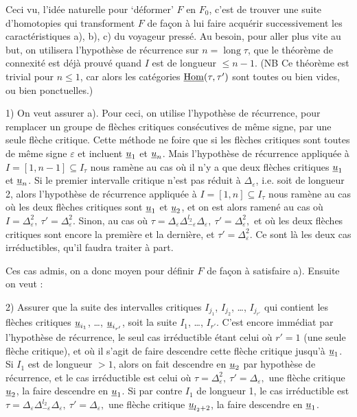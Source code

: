Ceci vu, l'idée naturelle pour ‘déformer’ $F$ en $F_0$, c'est de trouver une suite d'homotopies qui transforment $F$ de façon à lui faire acquérir successivement les caractéristiques a), b), c) du voyageur pressé. Au besoin, pour aller plus vite au but, on utilisera l'hypothèse de récurrence sur $n=\operatorname{long}\tau$, que le théorème de connexité est déjà prouvé quand $I$ est de longueur $\leq n-1$. (NB Ce théorème est trivial pour $n\leq1$, car alors les catégories $\underline{\mathrm{Hom}}(\tau,\tau')$ sont toutes ou bien vides, ou bien ponctuelles.)

1) On veut assurer a). Pour ceci, on utilise l'hypothèse de récurrence, pour remplacer un groupe de flèches critiques consécutives de même signe, par une seule flèche critique. Cette méthode ne foire que si les flèches critiques sont toutes de même signe $\varepsilon$ et incluent $\underline{u}_1$ et $\underline{u}_n$. Mais l'hypothèse de récurrence appliquée à $I=[1,n-1]\subseteq I_\tau$ nous ramène au cas où il n'y a que deux flèches critiques $\underline{u}_1$ et $\underline{u}_n$. Si le premier intervalle critique n'est pas réduit à $\Delta_\varepsilon$, i.e. soit de longueur 2, alors l'hypothèse de récurrence appliquée à $I=[1,n]\subseteq I_\tau$ nous ramène au cas où les deux flèches critiques sont $\underline{u}_1$ et $\underline{u}_2$, et on est
alors ramené au cas où $\boxed{I=\Delta^2_\varepsilon,\ \tau'=\Delta^2_\varepsilon.}$ Sinon, au cas où $\boxed{\tau=\Delta_\varepsilon\Delta^{l_2}_{-\varepsilon}\Delta_\varepsilon,\ \tau'=\Delta^2_\varepsilon,}$ et où les deux flèches critiques sont encore la première et la dernière, et $\tau'=\Delta^2_\varepsilon$. Ce sont là les deux cas irréductibles, qu'il faudra traiter à part.

Ces cas admis, on a donc moyen pour définir $F$ de façon à satisfaire a). Ensuite on veut :

2) Assurer que la suite des intervalles critiques $I_{j_1}$, $I_{j_2}$, \dots, $I_{j_{r'}}$ qui contient les flèches critiques $\underline{u}_{i_1}$, \dots, $\underline{u}_{i_{r'}}$, soit la suite $I_1$, \dots, $I_{r'}$. C'est encore immédiat par l'hypothèse de récurrence, le seul cas irréductible étant celui où $r'=1$ (une seule flèche critique), et où il s'agit de faire descendre cette flèche critique jusqu'à $\underline{u}_1$. Si $I_1$ est de longueur $>1$, alors on fait descendre en $\underline{u}_2$ par hypothèse de récurrence, et le cas irréductible est celui où $\boxed{\tau=\Delta^2_\varepsilon,\ \tau'=\Delta_\varepsilon,}$ une flèche critique $\underline{u}_2$, la faire descendre en $\underline{u}_1$. Si par contre $I_1$ de longueur 1, le cas irréductible est $\boxed{\tau=\Delta_\varepsilon\Delta^{l_2}_{-\varepsilon}\Delta_\varepsilon,\ \tau'=\Delta_\varepsilon,}$ une flèche critique $\underline{u}_{l_2+2}$, la faire descendre en $\underline{u}_1$.

